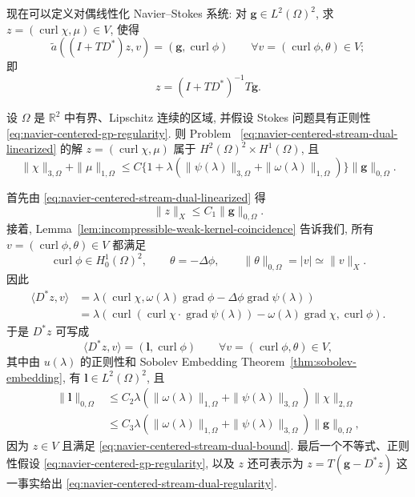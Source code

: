 现在可以定义对偶线性化 Navier--Stokes 系统:
对 $\boldsymbol g\in L^2(\Omega)^2$, 求
$z=(\operatorname{curl}\chi,\mu)\in V$, 使得
\begin{equation}\label{eq:navier-centered-stream-dual-linearized}
\widetilde a((I+TD^*)z,v)
=(\boldsymbol g,\operatorname{curl}\phi)
\qquad
\forall v=(\operatorname{curl}\phi,\theta)\in V;
\end{equation}
即
\[
z=(I+TD^*)^{-1}T\boldsymbol g.
\]

\setcounter{statement}{0}
\begin{Lemma}\label{lem:navier-centered-stream-dual-regularity}
设 $\Omega$ 是 $\mathbb R^2$ 中有界、Lipschitz 连续的区域,
并假设 Stokes 问题具有正则性
\eqref{eq:navier-centered-gp-regularity}. 则 Problem~
\eqref{eq:navier-centered-stream-dual-linearized} 的解
$z=(\operatorname{curl}\chi,\mu)$ 属于
$H^2(\Omega)^2\times H^1(\Omega)$, 且
\begin{equation}\label{eq:navier-centered-stream-dual-regularity}
\|\chi\|_{3,\Omega}+\|\mu\|_{1,\Omega}
\leq C\{1+\lambda(\|\psi(\lambda)\|_{3,\Omega}
+\|\omega(\lambda)\|_{1,\Omega})\}
\|\boldsymbol g\|_{0,\Omega}.
\end{equation}
\end{Lemma}
\begin{Proof}
首先由 \eqref{eq:navier-centered-stream-dual-linearized} 得
\begin{equation}\label{eq:navier-centered-stream-dual-bound}
\|z\|_X\leq C_1\|\boldsymbol g\|_{0,\Omega}.
\end{equation}
接着, Lemma~\ref{lem:incompressible-weak-kernel-coincidence} 告诉我们,
所有 $v=(\operatorname{curl}\phi,\theta)\in V$ 都满足
\[
\operatorname{curl}\phi\in H_0^1(\Omega)^2,
\qquad
\theta=-\Delta\phi,
\qquad
\|\theta\|_{0,\Omega}=|v|\simeq\|v\|_X.
\]
因此
\[
\begin{aligned}
\langle D^*z,v\rangle
&=\lambda(\operatorname{curl}\chi,
\omega(\lambda)\operatorname{grad}\phi
-\Delta\phi\operatorname{grad}\psi(\lambda))\\
&=\lambda(\operatorname{curl}
(\operatorname{curl}\chi\cdot\operatorname{grad}\psi(\lambda))
-\omega(\lambda)\operatorname{grad}\chi,
\operatorname{curl}\phi).
\end{aligned}
\]
于是 $D^*z$ 可写成
\[
\langle D^*z,v\rangle=(\boldsymbol l,\operatorname{curl}\phi)
\qquad\forall v=(\operatorname{curl}\phi,\theta)\in V,
\]
其中由 $u(\lambda)$ 的正则性和 Sobolev Embedding
Theorem~\ref{thm:sobolev-embedding}, 有 $\boldsymbol l\in L^2(\Omega)^2$, 且
\[
\begin{aligned}
\|\boldsymbol l\|_{0,\Omega}
&\leq C_2\lambda(\|\omega(\lambda)\|_{1,\Omega}
+\|\psi(\lambda)\|_{3,\Omega})\|\chi\|_{2,\Omega}\\
&\leq C_3\lambda(\|\omega(\lambda)\|_{1,\Omega}
+\|\psi(\lambda)\|_{3,\Omega})
\|\boldsymbol g\|_{0,\Omega},
\end{aligned}
\]
因为 $z\in V$ 且满足 \eqref{eq:navier-centered-stream-dual-bound}.
最后一个不等式、正则性假设
\eqref{eq:navier-centered-gp-regularity}, 以及 $z$ 还可表示为
$z=T(\boldsymbol g-D^*z)$ 这一事实给出
\eqref{eq:navier-centered-stream-dual-regularity}.
\end{Proof}

